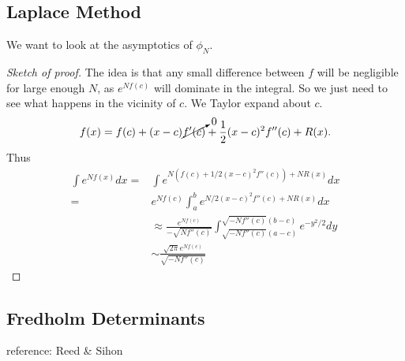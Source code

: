 \subsection*{Laplace Method}
We want to look at the asymptotics of $\phi_N$. 
\begin{proof}[Sketch of proof]
    The idea is that any small difference between $f$ will be negligible for large enough $N$, as $e^{Nf(c)}$ will dominate in the integral. So we just need to see what happens in the vicinity of $c$.
    We Taylor expand about $c$. \begin{align*}
        f(x) = f(c) +(x-c)\cancelto{0}{f'(c)} + \frac{1}{2}(x-c)^2f''(c) + R(x).
    \end{align*}
    Thus \begin{align*}
        \int e^{Nf(x)} dx =& \int e^{N(f(c)+1/2(x-c)^2f''(c))+NR(x)}dx \\
        =& e^{Nf(c)}\int_a^b e^{N/2 (x-c)^2 f''(c)+NR(x)}dx \\
        &\approx \frac{e^{Nf(c)}}{-\sqrt{Nf''(c)}} \int_{\sqrt{-Nf''(c)}(a-c)}^{\sqrt{-Nf''(c)}(b-c)}e^{-y^2/2}dy\\
        &\sim \frac{\sqrt{2\pi}e^{Nf(c)}}{\sqrt{-Nf''(c)}}
    \end{align*}
\end{proof}
\subsection*{Fredholm Determinants}
reference: Reed \& Sihon

